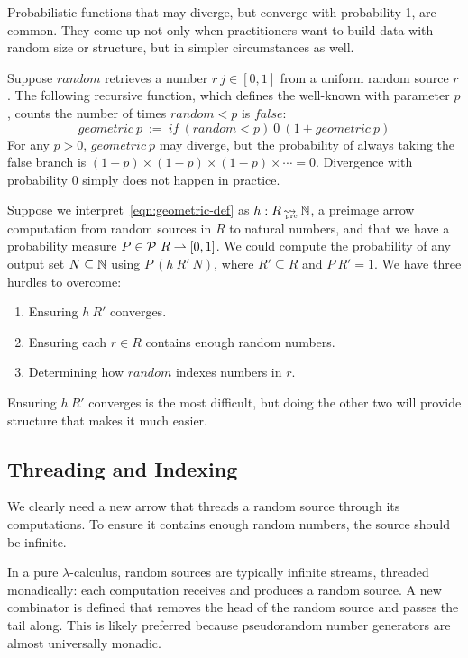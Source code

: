 \documentclass[preprint]{sigplanconf}
\newcommand{\arrow}{\rightsquigarrow}
\newcommand{\pto}{\rightharpoonup}
\newcommand{\pre}{_\mathrm{pre}}
\DeclareMathOperator{\preto}{\arrow_{\mspace{-19mu}\pre}}
\begin{document}
Probabilistic functions that may diverge, but converge with probability 1, are common.
They come up not only when practitioners want to build data with random size or structure, but in simpler circumstances as well.

Suppose $random$ retrieves a number $r~j \in [0,1]$ from a uniform random source $r$.
The following recursive function, which defines the well-known  with parameter $p$, counts the number of times $random < p$ is $false$:
\begin{equation}
	geometric~p \ := \ if~(random < p)~0~(1 + geometric~p)
\label{eqn:geometric-def}
\end{equation}
For any $p > 0$, $geometric~p$ may diverge, but the probability of always taking the false branch is $(1-p) \times (1-p) \times (1-p) \times \cdots = 0$.
Divergence with probability $0$ simply does not happen in practice.

Suppose we interpret~\eqref{eqn:geometric-def} as $h : R \preto \Nat$, a preimage arrow computation from random sources in $R$ to natural numbers, and that we have a probability measure $P \in \powerset~R \pto [0,1]$.
We could compute the probability of any output set $N \subseteq \mathbb{N}$ using $P~(h~R'~N)$, where $R' \subseteq R$ and $P~R' = 1$. We have three hurdles to overcome:
\begin{enumerate}
	\item Ensuring $h~R'$ converges.
	\item Ensuring each $r \in R$ contains enough random numbers.
	\item Determining how $random$ indexes numbers in $r$.
\end{enumerate}
Ensuring $h~R'$ converges is the most difficult, but doing the other two will provide structure that makes it much easier.

\subsection{Threading and Indexing}

We clearly need a new arrow that threads a random source through its computations.
To ensure it contains enough random numbers, the source should be infinite.

In a pure $\lambda$-calculus, random sources are typically infinite streams, threaded monadically: each computation receives and produces a random source.
A new combinator is defined that removes the head of the random source and passes the tail along.
This is likely preferred because pseudorandom number generators are almost universally monadic.
\end{document}
